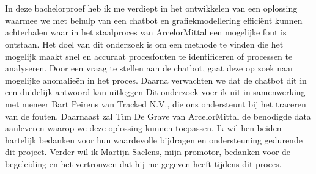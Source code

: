 
\chapter*{}%
\label{ch:voorwoord}

In deze bachelorproef heb ik me verdiept in het ontwikkelen van een oplossing waarmee we met behulp van een chatbot en grafiekmodellering efficiënt kunnen achterhalen waar in het staalproces van ArcelorMittal een mogelijke fout is ontstaan. 
Het doel van dit onderzoek is om een methode te vinden die het mogelijk maakt snel en accuraat procesfouten te identificeren of processen te analyseren.
Door een vraag te stellen aan de chatbot, gaat deze op zoek naar mogelijke anomalieën in het proces. Daarna verwachten we dat de chatbot dit in een duidelijk antwoord kan uitleggen
Dit onderzoek voer ik uit in samenwerking met meneer Bart Peirens van Tracked N.V., die ons ondersteunt bij het traceren van de fouten. Daarnaast zal Tim De Grave van ArcelorMittal de benodigde data aanleveren waarop we deze oplossing kunnen toepassen. 
Ik wil hen beiden hartelijk bedanken voor hun waardevolle bijdragen en ondersteuning gedurende dit project. Verder wil ik Martijn Saelens, mijn promotor, bedanken voor de begeleiding en het vertrouwen dat hij me gegeven heeft tijdens dit proces.
